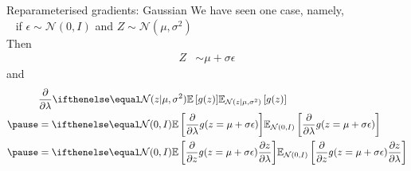 \begin{frame}{Reparameterised gradients: Gaussian}
	We have  seen one case, namely,\\
	~ if $\epsilon \sim \mathcal N(0, I)$ and $Z \sim \mathcal N(\mu,\sigma^2)$\pause\\
	Then
	\begin{equation*}
	\begin{aligned}
		Z &\sim \mu +  \sigma  \epsilon
	\end{aligned}
	\end{equation*}
	and
	\begin{equation*}
	\begin{aligned}
		&\pdv{\lambda} \E[\mathcal N(z|\mu, \sigma^2)]{ g(z) }\\ \pause
		&= \E[\mathcal N(0, I)]{\pdv{\lambda} g(z = \mu + \sigma  \epsilon)} \\ \pause
		&= \E[\mathcal N(0, I)]{\pdv{z} g(z = \mu + \sigma  \epsilon) \pdv{z}{\lambda}}
	\end{aligned}
	\end{equation*}
\end{frame}

